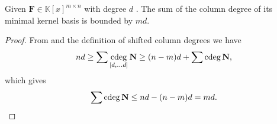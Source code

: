 \begin{cor}
Given $\mathbf{F}\in\mathbb{K}\left[x\right]^{m\times n}$ with degree
$d$ . The sum of the column degree of its minimal kernel basis is
bounded by $md$.\end{cor}
\begin{proof}
From  and
the definition of shifted column degrees we have 
\[
nd\ge\sum\cdeg_{\left[d,\dots d\right]}\mathbf{N}\ge(n-m)d+\sum\cdeg\mathbf{N},
\]
 which gives 
\[
\sum\cdeg\mathbf{N}\le nd-(n-m)d=md.
\]

\end{proof}
\begin{comment}
Our intermediate computations should not blow up in size but should
also not be too expensive. Our algorithm will reduce a single null
space computation to a set of null space computations of smaller size.
These smaller problems are constructed by the computations of residuals
which in all cases involves the multiplication of two polynomial matrices
having unbalanced degrees. The following lemma, whose proof we defer
until a later section, says that this can be done efficiently.
\begin{lem}
\label{lem:multiplyUnbalancedMatrices-1} Let $\vec{s}$ be a shift
ordered in terms of increasing values and $\xi$, a bound on the sum
of the entries of $\vec{s}$. Let $\mathbf{A}\in\mathbb{K}\left[x\right]^{m\times n}$,
with column degrees bounded by $\vec{s}$ and $\mathbf{B}\in\mathbb{K}\left[x\right]^{n\times k}$
with $k\in O\left(m\right)$ and the sum $\theta$ of its $\vec{s}$-column
degrees satisfying $\theta\in O\left(\xi\right)$. Then we can multiply
$\mathbf{A}$ and $\mathbf{B}$ with a cost of $O^{\sim}(nm^{\omega-2}\xi)$. \end{lem}
\end{comment}





